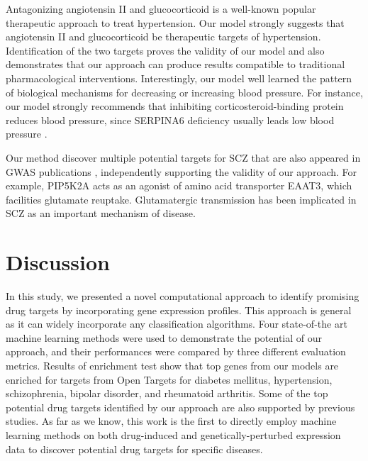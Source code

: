     Antagonizing angiotensin II and glucocorticoid is a well-known popular therapeutic approach to treat hypertension. Our model strongly suggests that angiotensin II and glucocorticoid be therapeutic targets of hypertension. Identification of the two targets proves the validity of our model and also demonstrates that our approach can produce results compatible to traditional pharmacological interventions. Interestingly, our model well learned the pattern of biological mechanisms for decreasing or increasing blood pressure. For instance, our model strongly recommends that inhibiting corticosteroid-binding protein reduces blood pressure, since SERPINA6 deficiency usually leads low blood pressure \cite{torpy2001familial}. 
  
    Our method discover multiple potential targets for SCZ that are also appeared in GWAS publications \cite{zhang2015functional,golimbet2014study,lee2013pathway,sinclair2012glucocorticoid,ahmad2015association,kishi2011sirt1,athanasiou2011candidate,hoenicka2010sexually,tein2008short,sun2004cldn5,chen2004case,yu2008association,hashimoto2005functional}, independently supporting the validity of our approach. For example, PIP5K2A acts as an agonist of amino acid transporter EAAT3, which facilities glutamate reuptake. Glutamatergic transmission has been implicated in SCZ as an important mechanism of disease.

\section{Discussion}
  In this study, we presented a novel computational approach to identify promising drug targets by incorporating gene expression profiles. This approach is general as it can widely incorporate any classification algorithms. Four state-of-the art machine learning methods were used to demonstrate the potential of our approach, and their performances were compared by three different evaluation metrics. Results of enrichment test show that top genes from our models are enriched for targets from Open Targets for diabetes mellitus, hypertension, schizophrenia, bipolar disorder, and rheumatoid arthritis. Some of the top potential drug targets identified by our approach are also supported by previous studies. As far as we know, this work is the first to directly employ machine learning methods on both drug-induced and genetically-perturbed expression data to discover potential drug targets for specific diseases. 


